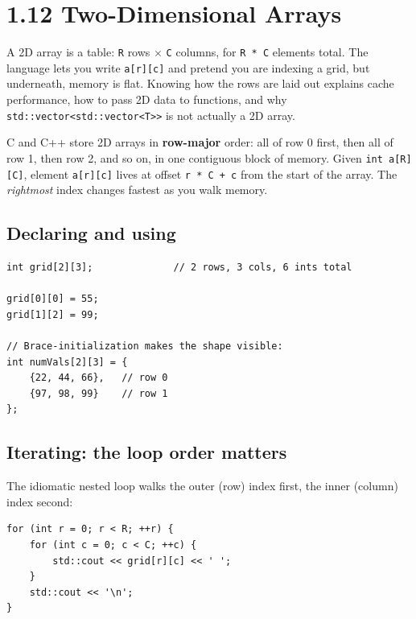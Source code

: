 \documentclass[11pt]{article}
\begin{document}
\section{1.12 Two-Dimensional Arrays}

A 2D array is a table: \texttt{R} rows $\times$ \texttt{C} columns, for
\texttt{R * C} elements total. The language lets you write
\texttt{a[r][c]} and pretend you are indexing a grid, but underneath,
memory is flat. Knowing how the rows are laid out explains cache
performance, how to pass 2D data to functions, and why
\texttt{std::vector<std::vector<T>>} is not actually a 2D array.

\begin{defnbox}
C and C++ store 2D arrays in \textbf{row-major} order: all of row 0
first, then all of row 1, then row 2, and so on, in one contiguous
block of memory. Given \texttt{int a[R][C]}, element \texttt{a[r][c]}
lives at offset \texttt{r * C + c} from the start of the array. The
\emph{rightmost} index changes fastest as you walk memory.
\end{defnbox}

\subsection{Declaring and using}

\begin{examplebox}
\begin{verbatim}
int grid[2][3];              // 2 rows, 3 cols, 6 ints total

grid[0][0] = 55;
grid[1][2] = 99;

// Brace-initialization makes the shape visible:
int numVals[2][3] = {
    {22, 44, 66},   // row 0
    {97, 98, 99}    // row 1
};
\end{verbatim}
\end{examplebox}

\subsection{Iterating: the loop order matters}

The idiomatic nested loop walks the outer (row) index first, the inner
(column) index second:

\begin{examplebox}
\begin{verbatim}
for (int r = 0; r < R; ++r) {
    for (int c = 0; c < C; ++c) {
        std::cout << grid[r][c] << ' ';
    }
    std::cout << '\n';
}
\end{verbatim}
\end{examplebox}
\end{document}
